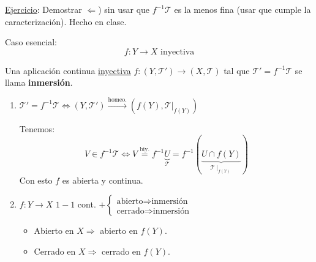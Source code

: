 \underline{Ejercicio}: Demostrar $\Leftarrow$) sin usar que $f^{-1}\mathcal{T}$ es la menos fina (usar que cumple la caracterización). Hecho en clase.

Caso esencial: 
\[
\boxed{f: Y \rightarrow X \text{ inyectiva}} 
\]
\begin{defi}
Una aplicación continua \underline{inyectiva} $f: \left( Y, \mathcal{T}' \right) \rightarrow \left( X, \mathcal{T} \right)$ tal que $\mathcal{T}' = f^{-1} \mathcal{T}$ se llama \textbf{inmersión}.
\end{defi}

\begin{obs}
\begin{enumerate}
    \item $\mathcal{T}' = f^{-1}\mathcal{T} \Leftrightarrow \left( Y, \mathcal{T}' \right) \xrightarrow{\text{homeo.}} \left( f\left( Y \right), \mathcal{T}|_{f\left( Y \right)} \right)$
    \begin{demo}    
    Tenemos:
    \[
    V \in f^{-1}\mathcal{T} \Leftrightarrow V \stackrel{\text{biy.}}{=} f^{-1}\underbrace{U}_{\mathcal{T}} = f^{-1}\left( \underbrace{U \cap f\left( Y \right)}_{\mathcal{T}\mid_{f\left( Y \right)}} \right)
    \]
    Con esto $f$ es abierta y continua.
    \end{demo}

    \item $f: Y \rightarrow X$ $1-1$ cont. $+ \begin{cases}
        \text{abierto} \Rightarrow \text{inmersión }\\
        \text{cerrado} \Rightarrow \text{inmersión } 
    \end{cases}$
    \begin{demo}
        \begin{itemize}
            \item Abierto en $X \Rightarrow$ abierto en $f\left( Y \right)$.
            \item Cerrado en $X \Rightarrow$ cerrado en $f\left( Y \right)$.
        \end{itemize}
    \end{demo}


\end{enumerate}
\end{obs}
